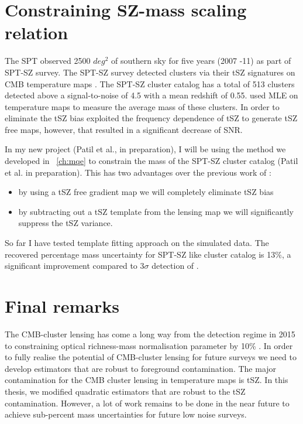  
 

\section{Constraining SZ-mass scaling relation}
\label{sz_mass}
The SPT observed 2500 $deg^{2}$ of southern sky for five years (2007 -11) as part of SPT-SZ survey.
The SPT-SZ survey detected clusters via their tSZ signatures on CMB temperature maps \citep{bleem15}. The SPT-SZ cluster catalog has a total of 513 clusters detected above a signal-to-noise of 4.5 with a mean redshift of 0.55.
\citet{baxter15} used MLE on temperature maps to measure the average mass of these clusters. 
In order to eliminate the tSZ bias \citet{baxter15} exploited the frequency dependence of tSZ to generate tSZ free maps, however, that resulted in a significant decrease of SNR. 

In my new project (Patil et al., in preparation), I will be using the method we developed in  ~\ref{ch:mqe} to constrain the mass of the SPT-SZ cluster catalog (Patil et al. in preparation). This has two advantages over the previous work of \citet{baxter15}:
\begin{itemize}
\item by using a tSZ free gradient map we will completely eliminate tSZ bias
\item by subtracting out a tSZ template from the lensing map we will significantly suppress the tSZ variance. 
\end{itemize}
So far I have tested template fitting approach \citep{patil19} on the simulated data. The recovered percentage mass uncertainty for SPT-SZ like cluster catalog is 13\%, a significant improvement compared to $3\sigma$ detection of \citet{baxter15}.

\section{Final remarks}
\label{concluding_remarks}
The CMB-cluster lensing has come a long way from the detection regime in 2015 \citep{baxter15} to constraining optical richness-mass normalisation parameter by 10\% \citep{geach17}. 
In order to fully realise the potential of CMB-cluster lensing for future surveys we need to develop estimators that are robust to foreground contamination. 
The major contamination for the CMB cluster lensing in temperature maps is tSZ. 
In this thesis, we modified quadratic estimators that are robust to the tSZ contamination. %
However, a lot of work remains to be done in the near future to achieve sub-percent mass uncertainties for future low noise surveys.

